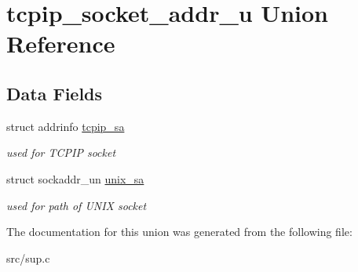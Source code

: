 \hypertarget{uniontcpip__socket__addr__u}{}\section{tcpip\+\_\+socket\+\_\+addr\+\_\+u Union Reference}
\label{uniontcpip__socket__addr__u}
\subsection*{Data Fields}
\begin{DoxyCompactItemize}
\item 
\mbox{\label{uniontcpip__socket__addr__u_aa275572d9e0c66fde5b3d2ef694a0706}} 
struct addrinfo \hyperlink{uniontcpip__socket__addr__u_aa275572d9e0c66fde5b3d2ef694a0706}{tcpip\+\_\+sa}
\begin{DoxyCompactList}\small\item\em used for T\+C\+P\+IP socket \end{DoxyCompactList}\item 
\mbox{\label{uniontcpip__socket__addr__u_a1b70bfa43e9440fbf699ba5ae7d8881c}} 
struct sockaddr\+\_\+un \hyperlink{uniontcpip__socket__addr__u_a1b70bfa43e9440fbf699ba5ae7d8881c}{unix\+\_\+sa}
\begin{DoxyCompactList}\small\item\em used for path of U\+N\+IX socket \end{DoxyCompactList}\end{DoxyCompactItemize}


The documentation for this union was generated from the following file\+:\begin{DoxyCompactItemize}
\item 
src/sup.\+c\end{DoxyCompactItemize}
